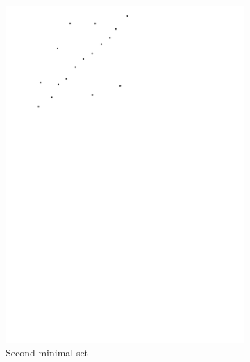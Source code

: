 \begin{figure}
\begin{subfigure}[b]{0.24\linewidth}
		\includegraphics[width=\textwidth,page=3]{figs/ransac.pdf}
		\caption{Second minimal set}\label{fig:ransac:c}
	\end{subfigure}
	\begin{subfigure}[b]{0.24\linewidth}
		\centering

\end{subfigure}
\end{figure}
